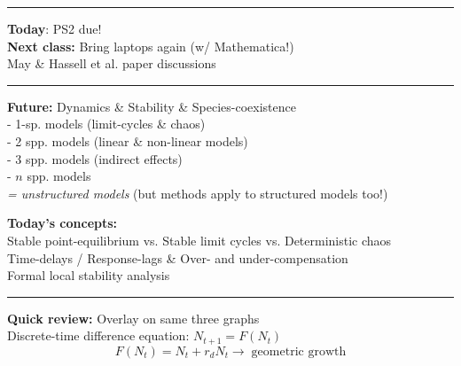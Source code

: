 \documentclass{article}
\newcommand{\note}[1]{\colorbox{gray!30}{#1}}
\newcommand{\ind}{\-\hspace{1cm}}
\begin{document}
\noindent{}
\rule[0.5ex]{\linewidth}{1pt}
\textbf{Today}: PS2 due!\\
\textbf{Next class:} Bring laptops again (w/ Mathematica!)\\
\ind \ind May \& Hassell et al. paper discussions\\
\rule[0.5ex]{\linewidth}{1pt}
\textbf{Future:}
Dynamics \& Stability \& Species-coexistence\\
\ind \ind - 1-sp. models (limit-cycles \& chaos)\\
\ind \ind - 2 spp. models (linear \& non-linear models)\\
\ind \ind - 3 spp. models (indirect effects)\\
\ind \ind - $n$ spp. models\\
\ind \emph{ = unstructured models} (but methods apply to structured models too!)

\textbf{Today's concepts:}\\
\ind Stable point-equilibrium vs. Stable limit cycles vs. Deterministic chaos\\
\ind Time-delays / Response-lags \& Over- and under-compensation\\
\ind Formal local stability analysis

\rule[0.5ex]{\linewidth}{1pt}

\textbf{Quick review:} \note{Overlay on same three graphs}\\
Discrete-time difference equation: $N_{t+1}=F(N_t)$
\begin{equation*}
	F(N_t)=N_t + r_d N_t \to \; \text{geometric growth}
\end{equation*}
\end{document}
